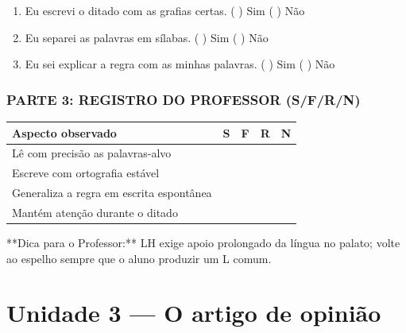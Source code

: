 \begin{exercicio}
\begin{enumerate}[label=\alph*)]
  \item Eu escrevi o ditado com as grafias certas.  \quad ( ) Sim   ( ) Não

  \item Eu separei as palavras em sílabas.  \quad ( ) Sim   ( ) Não

  \item Eu sei explicar a regra com as minhas palavras.  \quad ( ) Sim   ( ) Não

\end{enumerate}

\subsection*{PARTE 3: REGISTRO DO PROFESSOR (S/F/R/N)}

\begin{center}
\renewcommand{\arraystretch}{1.4}
\begin{tabular}{@{}p{9cm}cccc@{}}
\toprule
Aspecto observado & S & F & R & N \\
\midrule
Lê com precisão as palavras-alvo & & & & \\
Escreve com ortografia estável & & & & \\
Generaliza a regra em escrita espontânea & & & & \\
Mantém atenção durante o ditado & & & & \\
\bottomrule\end{tabular}\end{center}

\end{exercicio}

\begin{dica}
**Dica para o Professor:** LH exige apoio prolongado da língua no palato; volte ao espelho sempre que o aluno produzir um L comum.
\end{dica}


\chapter{Unidade 3 --- O artigo de opinião}


